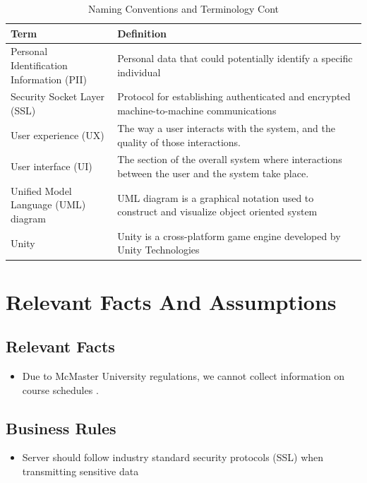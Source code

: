 \documentclass[12pt]{article}
\begin{document}
\begin{table}[H]
    \centering
    \begin{tabular}{|p{0.3\linewidth} | p{0.7\linewidth}| }
    \hline
    \textbf{Term} & \textbf{Definition}\\
    \hline
    Personal Identification Information (PII) & Personal data that could potentially identify a specific individual\\
    \hline
    Security Socket Layer (SSL) & Protocol for establishing authenticated and encrypted machine-to-machine communications\\
    \hline 
    User experience (UX) & The way a user interacts with the system, and the quality of those interactions.\\
    \hline 
    User interface (UI) & The section of the overall system where interactions between the user and the system take place.\\
    \hline
    Unified Model Language (UML) diagram & UML diagram is a graphical notation used to construct and visualize object oriented system\\
    \hline
    Unity & Unity is a cross-platform game engine developed by Unity Technologies\\
    \hline
    \end{tabular}
    \caption{Naming Conventions and Terminology Cont}
    \label{TblNaming2}
\end{table}

\section{Relevant Facts And Assumptions}
\subsection{Relevant Facts}
\begin{itemize}
  \item Due to McMaster University regulations, we cannot collect information on course schedules \cite{FIPPA}.
\end{itemize}

\subsection{Business Rules}
\begin{itemize}
  \item Server should follow industry standard security protocols (SSL)\cite{SSL} when transmitting sensitive data
\end{itemize}
\end{document}
